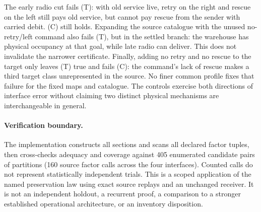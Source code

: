 \documentclass[11pt]{article}
\begin{document}
The early radio cut fails (T): with old service live, retry on the
right and rescue on the left still pays old service, but cannot
pay rescue from the sender with carried debit. (C) still holds.
Expanding the source catalogue with the unused no-retry/left
command also fails (T), but in the settled branch: the warehouse
has physical occupancy at that goal, while late radio can deliver.
This does not invalidate the narrower certificate. Finally, adding
no retry and no rescue to the target only leaves (T) true and
fails (C): the command's lack of rescue makes a third target class
unrepresented in the source. No finer common profile fixes that
failure for the fixed maps and catalogue. The controls exercise
both directions of interface error without claiming two distinct
physical mechanisms are interchangeable in general.

\paragraph{Verification boundary.}
The implementation constructs all sections and scans all declared
factor tuples, then cross-checks adequacy and coverage against 405
enumerated candidate pairs of partitions (160 source factor calls
across the four interfaces). Counted calls do not represent
statistically independent trials. This is a scoped application of
the named preservation law using exact source replays and an
unchanged receiver. It is not an independent holdout, a recurrent
proof, a comparison to a stronger established operational
architecture, or an inventory disposition.
\end{document}
